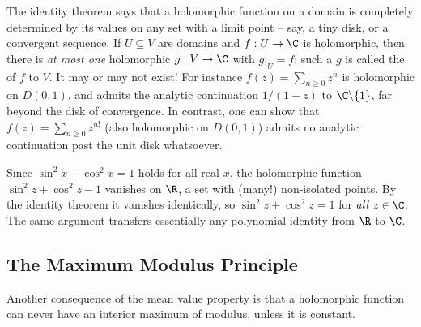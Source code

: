 \begin{remark}
    The identity theorem says that a holomorphic function on a domain is completely determined by its values on any set with a limit point -- say, a tiny disk, or a convergent sequence. If $U \subseteq V$ are domains and $f: U \rightarrow \C$ is holomorphic, then there is \emph{at most one} holomorphic $g: V \rightarrow \C$ with $g|_U = f$; such a $g$ is called the  of $f$ to $V$. It may or may not exist! For instance $f(z) = \sum_{n \geq 0} z^n$ is holomorphic on $D(0, 1)$, and admits the analytic continuation $1/(1 - z)$ to $\C \backslash \{1\}$, far beyond the disk of convergence. In contrast, one can show that $f(z) = \sum_{n \geq 0} z^{n!}$ (also holomorphic on $D(0, 1)$) admits no analytic continuation past the unit disk whatsoever.
\end{remark}

\begin{example}
    Since $\sin^2 x + \cos^2 x = 1$ holds for all real $x$, the holomorphic function $\sin^2 z + \cos^2 z - 1$ vanishes on $\R$, a set with (many!) non-isolated points. By the identity theorem it vanishes identically, so $\sin^2 z + \cos^2 z = 1$ for \emph{all} $z \in \C$. The same argument transfers essentially any polynomial identity from $\R$ to $\C$.
\end{example}

\subsection{The Maximum Modulus Principle}

Another consequence of the mean value property is that a holomorphic function can never have an interior maximum of modulus, unless it is constant.

